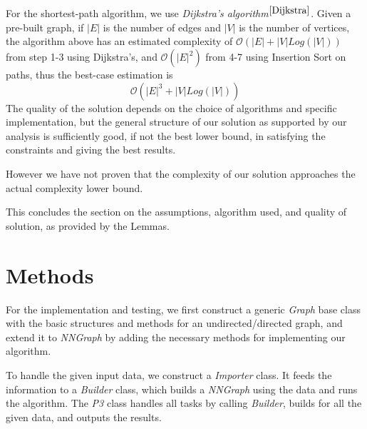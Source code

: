 \documentclass[12pt]{article}  %
\begin{document}
For the shortest-path algorithm, we use \emph{Dijkstra's algorithm}$^{\ref{Dijkstra}}$. Given a pre-built graph, if $|E|$ is the number of edges and $|V|$ is the number of vertices, the algorithm above has an estimated complexity of $\mathcal{O}(|E| + |V| Log(|V|))$ from step 1-3 using Dijkstra's, and $\mathcal{O}(|E|^2)$ from 4-7 using Insertion Sort on paths, thus the best-case estimation is 
$$\mathcal{O}(|E|^3 + |V| Log(|V|))$$
The quality of the solution depends on the choice of algorithms and specific implementation, but the general structure of our solution as supported by our analysis is sufficiently good, if not the best lower bound, in satisfying the constraints and giving the best results. 

However we have not proven that the complexity of our solution approaches the actual complexity lower bound.

This concludes the section on the assumptions, algorithm used, and quality of solution, as provided by the Lemmas.





\section{Methods}

For the implementation and testing, we first construct a generic \emph{Graph} base class with the basic structures and methods for an undirected/directed graph, and extend it to \emph{NNGraph} by adding the necessary methods for implementing our algorithm.

To handle the given input data, we construct a \emph{Importer} class. It feeds the information to a \emph{Builder} class, which builds a \emph{NNGraph} using the data and runs the algorithm. The \emph{P3} class handles all tasks by calling \emph{Builder}, builds for all the given data, and outputs the results.
\end{document}
